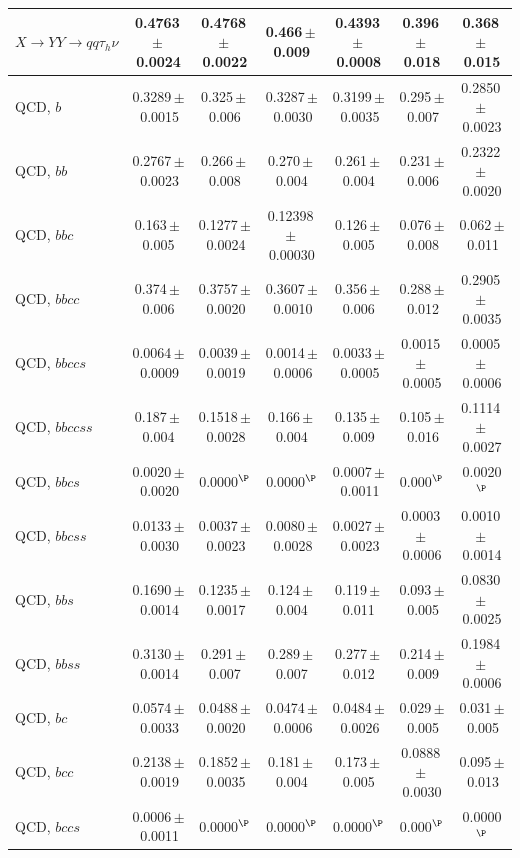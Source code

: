 \begin{landscape}
{\begin{longtable}{@{\extracolsep{\fill}}lcccccc@{}}
$X\to YY\to qq\tau_h\nu$ & 0.4763\,$\pm$\,0.0024 & 0.4768\,$\pm$\,0.0022 & 0.466\,$\pm$\,0.009 & 0.4393\,$\pm$\,0.0008 & 0.396\,$\pm$\,0.018 & 0.368\,$\pm$\,0.015 \\
\midrule
QCD, $b$ & 0.3289\,$\pm$\,0.0015 & 0.325\,$\pm$\,0.006 & 0.3287\,$\pm$\,0.0030 & 0.3199\,$\pm$\,0.0035 & 0.295\,$\pm$\,0.007 & 0.2850\,$\pm$\,0.0023 \\
QCD, $bb$ & 0.2767\,$\pm$\,0.0023 & 0.266\,$\pm$\,0.008 & 0.270\,$\pm$\,0.004 & 0.261\,$\pm$\,0.004 & 0.231\,$\pm$\,0.006 & 0.2322\,$\pm$\,0.0020 \\
QCD, $bbc$ & 0.163\,$\pm$\,0.005 & 0.1277\,$\pm$\,0.0024 & 0.12398\,$\pm$\,0.00030 & 0.126\,$\pm$\,0.005 & 0.076\,$\pm$\,0.008 & 0.062\,$\pm$\,0.011 \\
QCD, $bbcc$ & 0.374\,$\pm$\,0.006 & 0.3757\,$\pm$\,0.0020 & 0.3607\,$\pm$\,0.0010 & 0.356\,$\pm$\,0.006 & 0.288\,$\pm$\,0.012 & 0.2905\,$\pm$\,0.0035 \\
QCD, $bbccs$ & 0.0064\,$\pm$\,0.0009 & 0.0039\,$\pm$\,0.0019 & 0.0014\,$\pm$\,0.0006 & 0.0033\,$\pm$\,0.0005 & 0.0015\,$\pm$\,0.0005 & 0.0005\,$\pm$\,0.0006 \\
QCD, $bbccss$ & 0.187\,$\pm$\,0.004 & 0.1518\,$\pm$\,0.0028 & 0.166\,$\pm$\,0.004 & 0.135\,$\pm$\,0.009 & 0.105\,$\pm$\,0.016 & 0.1114\,$\pm$\,0.0027 \\
QCD, $bbcs$ & 0.0020\,$\pm$\,0.0020 & 0.0000$^{\P}$ & 0.0000$^{\P}$ & 0.0007\,$\pm$\,0.0011 & 0.000$^{\P}$ & 0.0020$^{\P}$ \\
QCD, $bbcss$ & 0.0133\,$\pm$\,0.0030 & 0.0037\,$\pm$\,0.0023 & 0.0080\,$\pm$\,0.0028 & 0.0027\,$\pm$\,0.0023 & 0.0003\,$\pm$\,0.0006 & 0.0010\,$\pm$\,0.0014 \\
QCD, $bbs$ & 0.1690\,$\pm$\,0.0014 & 0.1235\,$\pm$\,0.0017 & 0.124\,$\pm$\,0.004 & 0.119\,$\pm$\,0.011 & 0.093\,$\pm$\,0.005 & 0.0830\,$\pm$\,0.0025 \\
QCD, $bbss$ & 0.3130\,$\pm$\,0.0014 & 0.291\,$\pm$\,0.007 & 0.289\,$\pm$\,0.007 & 0.277\,$\pm$\,0.012 & 0.214\,$\pm$\,0.009 & 0.1984\,$\pm$\,0.0006 \\
QCD, $bc$ & 0.0574\,$\pm$\,0.0033 & 0.0488\,$\pm$\,0.0020 & 0.0474\,$\pm$\,0.0006 & 0.0484\,$\pm$\,0.0026 & 0.029\,$\pm$\,0.005 & 0.031\,$\pm$\,0.005 \\
QCD, $bcc$ & 0.2138\,$\pm$\,0.0019 & 0.1852\,$\pm$\,0.0035 & 0.181\,$\pm$\,0.004 & 0.173\,$\pm$\,0.005 & 0.0888\,$\pm$\,0.0030 & 0.095\,$\pm$\,0.013 \\
QCD, $bccs$ & 0.0006\,$\pm$\,0.0011 & 0.0000$^{\P}$ & 0.0000$^{\P}$ & 0.0000$^{\P}$ & 0.000$^{\P}$ & 0.0000$^{\P}$ \\

\end{longtable}}
\end{landscape}
